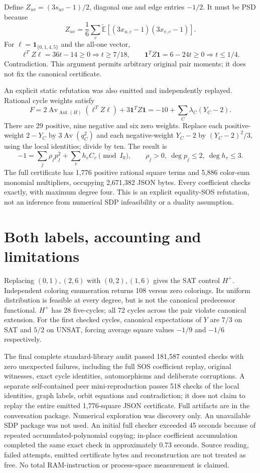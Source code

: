 \documentclass[11pt]{article}
\newcommand{\E}{\widetilde{\mathbb E}}
\newcommand{\av}{\operatorname{Av}}
\begin{document}
Define $Z_{uv}=(3s_{uv}-1)/2$, diagonal one and edge entries $-1/2$. It must be PSD because
\[
 Z_{uv}=\frac16\sum_c\E[(3x_{u,c}-1)(3x_{v,c}-1)].
\]
For $\ell=\mathbf1_{\{0,1,4,5\}}$ and the all-one vector,
\[
 \ell^TZ\ell=36t-14\ge0\Rightarrow t\ge7/18,
\qquad \mathbf1^TZ\mathbf1=6-24t\ge0\Rightarrow t\le1/4.
\]
Contradiction. This argument permits arbitrary original pair moments; it does not fix the canonical certificate.

An explicit static refutation was also emitted and independently replayed. Rational cycle weights satisfy
\[
 F=2\av_{\operatorname{Aut}(H)}(\ell^TZ\ell)+3\mathbf1^TZ\mathbf1
 =-10+\sum_C\lambda_C(Y_C-2).
\]
There are 29 positive, nine negative and six zero weights. Replace each positive-weight $2-Y_C$ by $3\av(q_C^2)$ and each negative-weight $Y_C-2$ by $(Y_C-2)^2/3$, using the local identities; divide by ten. The result is
\[
 -1=\sum_j\rho_jp_j^2+\sum_vh_vC_v\pmod{I_0},\qquad
 \rho_j>0,\ \deg p_j\le2,\ \deg h_v\le3.
\]
The full certificate has 1,776 positive rational square terms and 5,886 color-sum monomial multipliers, occupying 2,671,382 JSON bytes. Every coefficient checks exactly, with maximum degree four. This is an explicit equality-SOS refutation, not an inference from numerical SDP infeasibility or a duality assumption.

\section{Both labels, accounting and limitations}
Replacing $(0,1),(2,6)$ with $(0,2),(1,6)$ gives the SAT control $H^+$. Independent coloring enumeration returns 108 versus zero colorings. Its uniform distribution is feasible at every degree, but is not the canonical predecessor functional. $H^+$ has 28 five-cycles; all 72 cycles across the pair violate canonical extension. For the first checked cycles, canonical expectations of $Y$ are $7/3$ on SAT and $5/2$ on UNSAT, forcing average square values $-1/9$ and $-1/6$ respectively.

The final complete standard-library audit passed 181,587 counted checks with zero unexpected failures, including the full SOS coefficient replay, original witnesses, exact cycle identities, automorphisms and deliberate corruptions. A separate self-contained peer mini-reproduction passes 518 checks of the local identities, graph labels, orbit equations and contradiction; it does not claim to replay the entire emitted 1,776-square JSON certificate. Full artifacts are in the conversation package. Numerical exploration was discovery only. An unavailable SDP package was not used. An initial full checker exceeded 45 seconds because of repeated accumulated-polynomial copying; in-place coefficient accumulation completed the same exact check in approximately 0.73 seconds. Source reading, failed attempts, emitted certificate bytes and reconstruction are not treated as free. No total RAM-instruction or process-space measurement is claimed.
\end{document}
